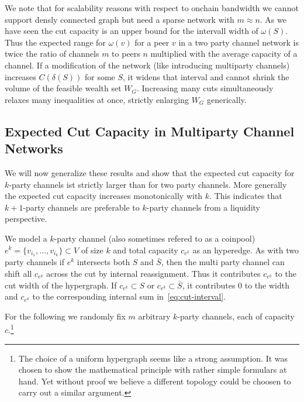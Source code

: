 \documentclass[10pt,twocolumn]{article}
\begin{document}
We note that for scalability reasons with respect to onchain bandwidth we cannot support densly connected graph but need a sparse network with $m\approx n$.
As we have seen the cut capacity is an upper bound for the intervall width of $\omega(S)$.
Thus the expected range for $\omega(v)$ for a peer $v$ in a two party channel network is twice the ratio of channels $m$ to peers $n$ multiplied with the average capacity of a channel.
If a modification of the network (like introducing multiparty channels) increases $C(\delta(S))$ for some $S$, it widens that interval and cannot shrink the volume of the feasible wealth set $W_G$.
Increasing many cuts simultaneously relaxes many inequalities at once, strictly enlarging $W_G$ generically.


\subsection{Expected Cut Capacity in Multiparty Channel Networks}
\label{subsec:hyperedge-cut}

We will now generalize these results and show that the expected cut capacity for $k$-party channels ist strictly larger than for two party channels. More generally the expected cut capacity increases monotonically with $k$.
This indicates that $k+1$-party channels are preferable to $k$-party channels from a liquidity perspective. 

We model a $k$-party channel (also sometimes refered to as a coinpool) $e^k = \{v_{i_1},\dots,v_{i_k}\}\subset V$ of size $k$ and total capacity $c_{e^k}$ as an hyperedge.
As with two party channels if $e^k$ intersects both $S$ and $\bar S$, then the multi party channel can shift all $c_{e^k}$ across the cut by internal reassignment.
Thus it contributes $c_{e^k}$ to the cut width of the hypergraph.
If $c_{e^k}\subset S$ or $c_{e^k}\subset\bar S$, it contributes $0$ to the width and $c_{e^k}$
to the corresponding internal sum in~\eqref{eq:cut-interval}.

For the following we randomly fix $m$ arbitrary $k$-party channels, each of capacity $c$.\footnote{The choice of a uniform hypergraph seems like a strong assumption. It was chosen to show the mathematical principle with rather simple formulars at hand. Yet without proof we believe a different topology could be choosen to carry out a similar argument.}


\end{document}
